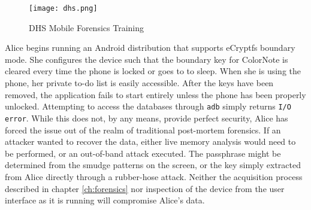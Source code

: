 \begin{figure}[htpb]
\begin{center}
\texttt{[image: dhs.png]}
\end{center}
\caption{DHS Mobile Forensics Training} 
\label{fig:dhs}
\end{figure}

Alice begins running an Android distribution that supports eCryptfs boundary mode. She configures the device such that the boundary
key for ColorNote is cleared every time the phone is locked or goes to to sleep. When she is using the phone, her private to-do list
is easily accessible. After the keys have been removed, the application fails to start entirely unless the phone has been properly
unlocked. Attempting to access the databases through \texttt{adb} simply returns \texttt{I/O error}. While this does not, by any
means, provide perfect security, Alice has forced the issue out of the realm of traditional post-mortem forensics. If an attacker
wanted to recover the data, either live memory analysis would need to be performed, or an out-of-band attack executed. The
passphrase might be determined from the smudge patterns on the screen, or the key simply extracted from Alice directly through a
rubber-hose attack. Neither the acquisition process described in chapter \ref{ch:forensics} nor inspection of the device from the
user interface as it is running will compromise Alice's data.

